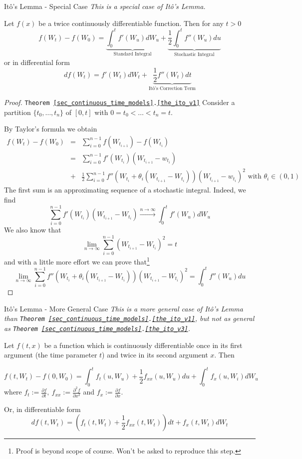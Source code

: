 \documentclass[11pt,a4paper]{article}
\begin{document}
  \begin{theorem}{It\^o's Lemma - Special Case}\label{the_ito_v1}
    \textit{This is a special case of It\^o's Lemma.}
    \par Let $f(x)$ be a twice continuously differentiable function. Then for any $t>0$
    \[ f(W_t)-f(W_0)=\underbrace{\int_0^tf'(W_u)dW_u}_\text{Standard Integral}+\underbrace{\frac12\int_0^tf''(W_u)du}_\text{Stochastic Integral} \]
    or in differential form
    \[ df(W_t)=f'(W_t)dW_t+\underbrace{\frac12f''(W_t)dt}_\text{It\^o's Correction Term} \]
  \end{theorem}

  \begin{proof}{\texttt{Theorem \ref{sec_continuous_time_models}.\ref{the_ito_v1}}}
    Consider a partition $\{t_0,\dots,t_n\}$ of $[0,t]$ with $0=t_0<\dots<t_n=t$.
    \par By Taylor's formula we obtain
    \[\begin{array}{rcl}
      f(W_t)-f(W_0)&=&\sum_{i=0}^{n-1}f(W_{t_{i+1}})-f(W_{t_i})\\
      &=&\sum_{i=0}^{n-1}f'(W_{t_i})(W_{t_{i+1}}-w_{t_i})\\
      &+&\frac12\sum_{i=0}^{n-1}f''(W_{t_i}+\theta_i(W_{t_{i+1}}-W_{t_i}))(W_{t_{i+1}}-w_{t_i})^2\text{ with }\theta_i\in(0,1)
    \end{array}\]
    The first sum is an approximating sequence of a stochastic integral. Indeed, we find
    \[ \sum_{i=0}^{n-1}f'(W_{t_i})(W_{t_{i+1}}-W_{t_i})\overset{n\to\infty}\longrightarrow\int_0^tf'(W_u)dW_u \]
    We also know that
    \[ \lim_{n\to\infty}\sum_{i=0}^{n-1}(W_{t_{i+1}}-W_{t_i})^2=t \]
    and with a little more effort we can prove that\footnote{Proof is beyond scope of course. Won't be asked to reproduce this step.}
    \[ \lim_{n\to\infty}\sum_{i=0}^{n-1}f''(W_{t_i}+\theta_i(W_{t_{i+1}}-W_{t_i}))(W_{t_{i+1}}-W_{t_i})^2=\int_0^tf''(W_u)du \]
    \proved
  \end{proof}

  \begin{theorem}{It\^o's Lemma - More General Case}\label{the_ito_v2}
    \textit{This is a more general case of It\^o's Lemma than \texttt{Theorem \ref{sec_continuous_time_models}.\ref{the_ito_v1}}, but not as general as \texttt{Theorem \ref{sec_continuous_time_models}.\ref{the_ito_v3}}.}
    \par Let $f(t,x)$ be a function which is continuously differentiable once in its first argument (the time parameter $t$) and twice in its second argument $x$. Then

    \[ f(t,W_t)-f(0,W_0)=\int_0^tf_t(u,W_u)+\frac12 f_{xx}(u,W_u)du +\int_0^tf_x(u,W_i)dW_u\]
    where $f_t:=\frac{\partial f}{\partial t},\ f_{xx}:=\frac{\partial^2 f}{\partial x^2}$ and $f_x:=\frac{\partial f}{\partial x}$.
    \par Or, in differentiable form
    \[ df(t,W_t)=(f_t(t,W_t)+\frac12f_{xx}(t,W_t))dt+f_x(t,W_t)dW_t \]
  \end{theorem}
\end{document}
